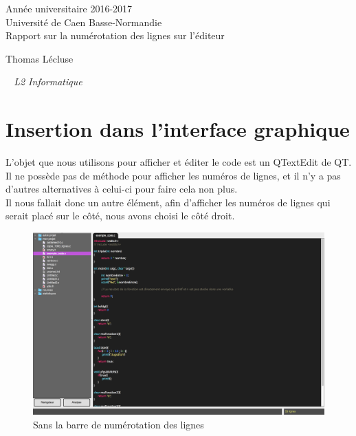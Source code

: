 \documentclass[a4paper,12pt]{article}
\begin{document}
\begin{titlepage}
	\begin{center}
		\Large{Année universitaire 2016-2017}\\
		\Large{Université de Caen Basse-Normandie}\\[1cm]
		
		\huge{Rapport sur la numérotation des lignes sur l'éditeur}\\
		\vspace{3cm}
		
		Thomas Lécluse
		
	\normalsize{\textit{ ~ L2 Informatique}}\\
		\medskip
		\vspace{2cm}
				
	\end{center}
\end{titlepage}

\tableofcontents
\newpage

\section{Insertion dans l'interface graphique}

	L'objet que nous utilisons pour afficher et éditer le code est un QTextEdit de QT. Il ne possède pas de méthode pour afficher les numéros de lignes, et il n'y a pas d'autres alternatives à celui-ci pour faire cela non plus.\\
	
	Il nous fallait donc un autre élément, afin d'afficher les numéros de lignes qui serait placé sur le côté, nous avons choisi le côté droit.
	
		\begin{figure}[h!]
			\begin{center}
				\includegraphics[scale=0.25]{images/avant}
				\caption{Sans la barre de numérotation des lignes}
			\end{center}
		\end{figure}
		
\end{document}

